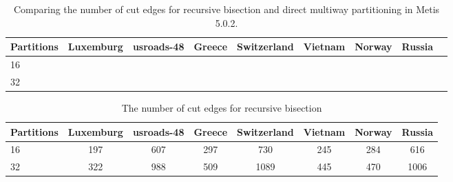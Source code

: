 \documentclass[unicode,11pt,a4paper,oneside,numbers=endperiod,openany]{scrartcl}
\begin{document}
\begin{table}[h]
\caption{Comparing the number of cut edges for recursive bisection and direct multiway partitioning in Metis 5.0.2.}
\centering
\begin{tabular}{l|r|r|r|r|r|r|r|r} \hline\hline 
Partitions       &   Luxemburg           & usroads-48 &  Greece &  Switzerland &  Vietnam  &  Norway &  Russia  \\ \hline
 16              &                       &            &         &              &           &         &          \\             
 32              &                       &            &         &              &           &         &          \\ \hline \hline
\end{tabular}              
\label{table:Compare_Metis}
\end{table}

\begin{table}[htbp]
    \centering
    \caption{The number of cut edges for recursive bisection}
    \label{tab:recursive_bisection}
    \begin{tabular}{lccccccc}
        \toprule
        \textbf{Partitions} & \textbf{Luxemburg} & \textbf{usroads-48} & \textbf{Greece} & \textbf{Switzerland} & \textbf{Vietnam} & \textbf{Norway} & \textbf{Russia} \\
        \midrule
        16 & 197 & 607 & 297 & 730 & 245 & 284 & 616 \\
        32 & 322 & 988 & 509 & 1089 & 445 & 470 & 1006 \\
        \bottomrule
    \end{tabular}
\end{table}
\end{document}

